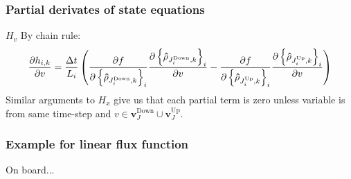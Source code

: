 \begin{frame}[t]\frametitle{Partial derivates of state equations}

\begin{block}{$H_v$}
By chain rule:
\begin{align*}
\frac{\partial h_{i,k}}{\partial v}=\frac{\Delta t}{L_{i}}\left(\frac{\partial f}{\partial\left\{ \mathbf{\hat{\rho}}_{J_{i}^{\text{Down}},k}\right\} _{i}}\frac{\partial\left\{ \mathbf{\hat{\rho}}_{J_{i}^{\text{Down}},k}\right\} _{i}}{\partial v}-\frac{\partial f}{\partial\left\{ \mathbf{\hat{\rho}}_{J_{i}^{\text{Up}},k}\right\} _{i}}\frac{\partial\left\{ \mathbf{\hat{\rho}}_{J_{i}^{\text{Up}},k}\right\} _{i}}{\partial v}\right)
\end{align*}
Similar arguments to $H_x$ give us that each partial term is zero unless variable is from same time-step and $v\in \mathbf{v}_J^{\text{Down}}\cup\mathbf{v}_J^{\text{Up}}$.
\end{block}
\end{frame}

\begin{frame}[t]\frametitle{Example for linear flux function}

\begin{example}
On board...
\end{example}

\end{frame}



